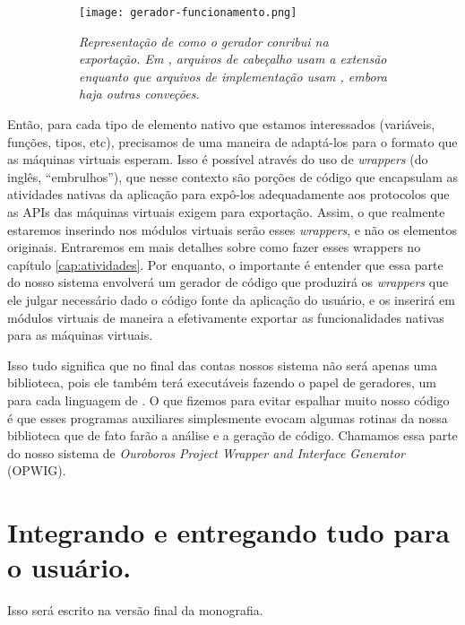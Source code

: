     \begin{figure}[ht]
      \centering
      \caption{}
      \begin{subfigure}{.8\textwidth}
        \begin{center}
          \texttt{[image: gerador-funcionamento.png]}
          \vspace{1em}

          \textit{
            Representação de como o gerador conribui na exportação.
            Em \CXX{}, arquivos de cabeçalho usam a extensão  enquanto
            que arquivos de implementação usam , embora haja outras
            conveções.
          }
        \end{center}
      \end{subfigure}
      \label{fig:gerador-funcionamento}
    \end{figure}

    Então, para cada tipo de elemento nativo que estamos interessados
    (variáveis, funções, tipos, etc), precisamos de uma maneira de adaptá-los
    para o formato que as máquinas virtuais esperam. Isso é possível através do
    uso de \textit{wrappers} (do inglês, ``embrulhos''), que nesse contexto são
    porções de código que encapsulam as atividades nativas da aplicação para
    expô-los adequadamente aos protocolos que as APIs das máquinas virtuais
    exigem para exportação. Assim, o que realmente estaremos inserindo nos
    módulos virtuais serão esses \textit{wrappers}, e não os elementos
    originais. Entraremos em mais detalhes sobre como fazer esses wrappers no
    capítulo \ref{cap:atividades}. Por enquanto, o importante é entender que
    essa parte do nosso sistema envolverá um gerador de código que produzirá
    os \textit{wrappers} que ele julgar necessário dado o código fonte da
    aplicação do usuário, e os inserirá em módulos virtuais de maneira a
    efetivamente exportar as funcionalidades nativas para as máquinas virtuais.

    Isso tudo significa que no final das contas nossos sistema não será apenas
    uma biblioteca, pois ele também terá executáveis fazendo o papel de
    geradores, um para cada linguagem de \script{}. O que fizemos para evitar
    espalhar muito nosso código é que esses programas auxiliares simplesmente
    evocam algumas rotinas da nossa biblioteca que de fato farão a análise e
    a geração de código. Chamamos essa parte do nosso sistema de \emph{Ouroboros
    Project Wrapper and Interface Generator} (OPWIG).
  
  \section{Integrando e entregando tudo para o usuário.}
  \label{sec:estrutura:integration}

    Isso será escrito na versão final da monografia.
